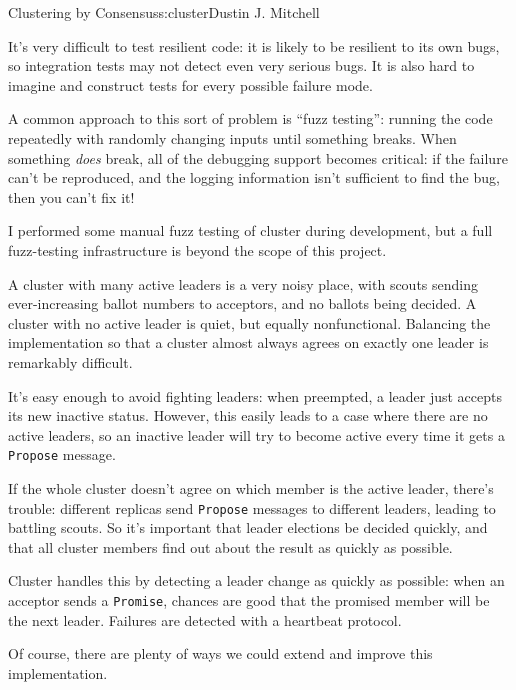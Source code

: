 \begin{aosachapter}{Clustering by Consensus}{s:cluster}{Dustin J. Mitchell}
\label{fuzz-testing}

It's very difficult to test resilient code: it is likely to be resilient
to its own bugs, so integration tests may not detect even very serious
bugs. It is also hard to imagine and construct tests for every possible
failure mode.

A common approach to this sort of problem is ``fuzz testing'': running
the code repeatedly with randomly changing inputs until something
breaks. When something \emph{does} break, all of the debugging support
becomes critical: if the failure can't be reproduced, and the logging
information isn't sufficient to find the bug, then you can't fix it!

I performed some manual fuzz testing of cluster during development, but
a full fuzz-testing infrastructure is beyond the scope of this project.

\label{power-struggles}

A cluster with many active leaders is a very noisy place, with scouts
sending ever-increasing ballot numbers to acceptors, and no ballots
being decided. A cluster with no active leader is quiet, but equally
nonfunctional. Balancing the implementation so that a cluster almost
always agrees on exactly one leader is remarkably difficult.

It's easy enough to avoid fighting leaders: when preempted, a leader
just accepts its new inactive status. However, this easily leads to a
case where there are no active leaders, so an inactive leader will try
to become active every time it gets a \texttt{Propose} message.

If the whole cluster doesn't agree on which member is the active leader,
there's trouble: different replicas send \texttt{Propose} messages to
different leaders, leading to battling scouts. So it's important that
leader elections be decided quickly, and that all cluster members find
out about the result as quickly as possible.

Cluster handles this by detecting a leader change as quickly as
possible: when an acceptor sends a \texttt{Promise}, chances are good
that the promised member will be the next leader. Failures are detected
with a heartbeat protocol.

\label{further-extensions}

Of course, there are plenty of ways we could extend and improve this
implementation.

\label{catching-up}


\end{aosachapter}

